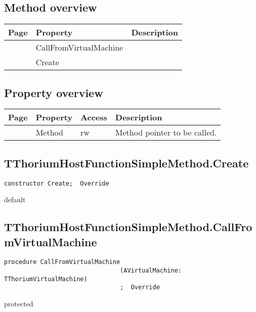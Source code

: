 \subsection{Method overview}
\label{thoriumcorepkg:thorium:tthoriumhostfunctionsimplemethod:methods}
\begin{tabularx}{\textwidth}{llX}
Page & Property & Description  \\ \hline
\pageref{thoriumcorepkg:thorium:tthoriumhostfunctionsimplemethod:callfromvirtualmachine} & CallFromVirtualMachine  &  \\
\pageref{thoriumcorepkg:thorium:tthoriumhostfunctionsimplemethod:create} & Create  &  \\
\hline
\end{tabularx}
\subsection{Property overview}
\label{thoriumcorepkg:thorium:tthoriumhostfunctionsimplemethod:properties}
\begin{tabularx}{\textwidth}{lllX}
Page & Property & Access & Description \\ \hline
\pageref{thoriumcorepkg:thorium:tthoriumhostfunctionsimplemethod:method} & Method & rw & Method pointer to be called. \\
\hline
\end{tabularx}
\subsection{TThoriumHostFunctionSimpleMethod.Create}
\label{thoriumcorepkg:thorium:tthoriumhostfunctionsimplemethod:create}
\begin{FPCList}
\Declaration 

\begin{verbatim}
constructor Create;  Override
\end{verbatim}
\Visibility
default
\end{FPCList}
\subsection{TThoriumHostFunctionSimpleMethod.CallFromVirtualMachine}
\label{thoriumcorepkg:thorium:tthoriumhostfunctionsimplemethod:callfromvirtualmachine}
\begin{FPCList}
\Declaration 

\begin{verbatim}
procedure CallFromVirtualMachine
                                (AVirtualMachine: TThoriumVirtualMachine)
                                ;  Override
\end{verbatim}
\Visibility
protected
\end{FPCList}
